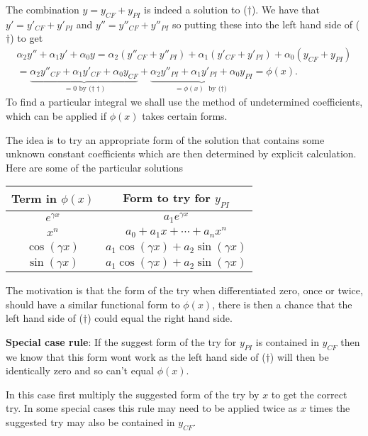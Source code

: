 \documentclass[10pt, a4paper]{article}
\begin{document}
The combination $y = y_{CF} + y_{PI}$ is indeed a solution to ($\dagger$).
We have that $y' = y'_{CF} + y'_{PI}$ and $y'' = y''_{CF} + y''_{PI}$ so putting these into the left hand side of ($\dagger$) to get
\begin{gather*}
    \alpha_2y'' + \alpha_1y' + \alpha_0y = \alpha_2(y''_{CF} + y''_{PI}) + \alpha_1(y'_{CF} +y'_{PI}) + \alpha_0(y_{CF} + y_{PI}) \\
    = \underbrace{\alpha_2y''_{CF} + \alpha_1y'_{CF} + \alpha_0y_{CF}}_{= 0 \text{ by ($\dagger\dagger$)}} + \underbrace{\alpha_2y''_{PI} + \alpha_1 y'_{PI} + \alpha_0y_{PI}}_{=\phi(x) \text{ by ($\dagger$)}} = \phi(x).
\end{gather*}
To find a particular integral we shall use the method of undetermined coefficients,
which can be applied if $\phi(x)$ takes certain forms.

The idea is to try an appropriate form of the solution that contains some unknown constant coefficients which are then determined by explicit calculation.
Here are some of the particular solutions
\begin{table}[H]
    \begin{tabular}{|c|c|}
        \hline
         Term in $\phi(x)$ & Form to try for $y_{PI}$ \\
         \hline
         $e ^ {\gamma x}$ & $a_1e ^ {\gamma x}$ \\
         $x ^ n$ & $a_0 + a_1x + \dotsi + a_nx ^ n$ \\
         $\cos(\gamma x)$ & $a_1\cos(\gamma x) + a_2\sin(\gamma x)$ \\
         $\sin(\gamma x)$ & $a_1\cos(\gamma x) + a_2\sin(\gamma x)$ \\
         \hline
    \end{tabular}
\end{table}

The motivation is that the form of the try when differentiated zero,
once or twice,
should have a similar functional form to $\phi(x)$,
there is then a chance that the left hand side of ($\dagger$) could equal the right hand side.

\textbf{Special case rule}:
If the suggest form of the try for $y_{PI}$ is contained in $y_{CF}$ then we know that this form wont work as the left hand side of ($\dagger$) will then be identically zero and so can't equal $\phi(x)$.

In this case first multiply the suggested form of the try by $x$ to get the correct try.
In some special cases this rule may need to be applied twice as $x$ times the suggested try may also be contained in $y_{CF}$.
\end{document}
